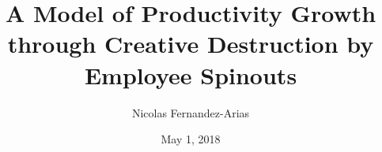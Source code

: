 \documentclass[english,usenames,dvipsnames]{beamer}
\title{A Model of Productivity Growth through Creative Destruction by Employee Spinouts}
\author{Nicolas Fernandez-Arias}
\date[May 1, 2018]{May 1, 2018}
\begin{document}
	
\frame{\titlepage}

\end{document}
